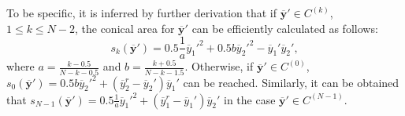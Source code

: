 \documentclass[10pt, journal]{IEEEtran}
\begin{document}
To be specific, it is inferred by further derivation that if $\overline{\mathbf{y}}' \in C^{(k)}$, $1\leq k \leq N-2$, the conical area for $\overline{\mathbf{y}}'$ can be efficiently calculated as follows:
\begin{equation}
s_k(\overline{\mathbf{y}}')= 0.5 \frac{1}{a}{\overline{y}_{1}'}^2 +0.5 b{\overline{y}_{2}'}^2 -\overline{y}_{1}'\overline{y}_{2}',
\end{equation}
where $a=\frac{k-0.5}{N-k-0.5}$ and $b=\frac{k+0.5}{N-k-1.5}$.
Otherwise, if $\overline{\mathbf{y}}' \in C^{(0)}$, $s_0(\overline{\mathbf{y}}')= 0.5 b{\overline{y}_{2}'}^2 +(\overline{y}_{2}^r-\overline{y}_{2}')\overline{y}_{1}'$ can be reached. Similarly, it can be obtained that $s_{N{-}1}(\overline{\mathbf{y}}')= 0.5 \frac{1}{a}{\overline{y}_{1}'}^2 + (\overline{y}_{1}^r-\overline{y}_{1}')\overline{y}_{2}'$ in the case $\overline{\mathbf{y}}' \in C^{(N-1)}$.

\end{document}
